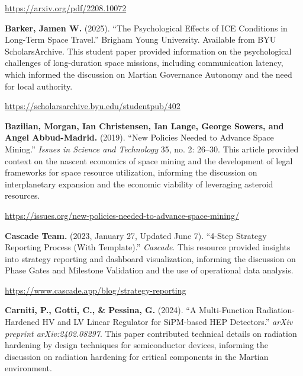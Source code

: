 \documentclass[fontsize=10pt, oneside, DIV=calc]{scrartcl}
\begin{document}
\href{https://arxiv.org/pdf/2208.10072}{\url{https://arxiv.org/pdf/2208.10072}}

\vspace{1em}
\noindent \textbf{Barker, Jamen W.} (2025). ``The Psychological Effects of ICE Conditions in Long-Term Space Travel.'' Brigham Young University. Available from BYU ScholarsArchive. This student paper provided information on the psychological challenges of long-duration space missions, including communication latency, which informed the discussion on Martian Governance Autonomy and the need for local authority. 



\href{https://scholarsarchive.byu.edu/studentpub/402}{\url{https://scholarsarchive.byu.edu/studentpub/402}}

\vspace{1em}
\noindent \textbf{Bazilian, Morgan, Ian Christensen, Ian Lange, George Sowers, and Angel Abbud-Madrid.} (2019). ``New Policies Needed to Advance Space Mining.'' \textit{Issues in Science and Technology} 35, no. 2: 26--30. This article provided context on the nascent economics of space mining and the development of legal frameworks for space resource utilization, informing the discussion on interplanetary expansion and the economic viability of leveraging asteroid resources. 



\href{https://issues.org/new-policies-needed-to-advance-space-mining/}{\url{https://issues.org/new-policies-needed-to-advance-space-mining/}}

\vspace{1em}
\noindent \textbf{Cascade Team.} (2023, January 27, Updated June 7). ``4-Step Strategy Reporting Process (With Template).'' \textit{Cascade}. This resource provided insights into strategy reporting and dashboard visualization, informing the discussion on Phase Gates and Milestone Validation and the use of operational data analysis. 



\href{https://www.cascade.app/blog/strategy-reporting}{\url{https://www.cascade.app/blog/strategy-reporting}}

\vspace{1em}
\noindent \textbf{Carniti, P., Gotti, C., \& Pessina, G.} (2024). ``A Multi-Function Radiation-Hardened HV and LV Linear Regulator for SiPM-based HEP Detectors.'' \textit{arXiv preprint arXiv:2402.08297}. This paper contributed technical details on radiation hardening by design techniques for semiconductor devices, informing the discussion on radiation hardening for critical components in the Martian environment. 
\end{document}
